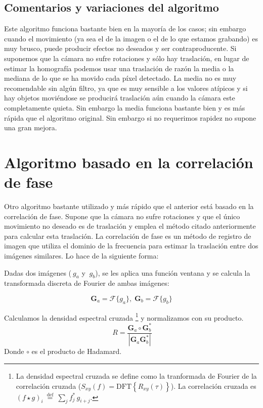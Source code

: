 \documentclass[a4paper,openright, 12pt]{book}
\begin{document}
\subsection{Comentarios y variaciones del algoritmo}
Este algoritmo funciona bastante bien en la mayoría de los casos; sin embargo cuando el movimiento (ya sea el de la imagen o el de lo que estamos grabando) es muy brusco, puede producir efectos no deseados y ser contraproducente. Si suponemos que la cámara no sufre rotaciones y sólo hay traslación, en lugar de estimar la homografía podemos usar una traslación de razón la media o la mediana de lo que se ha movido cada píxel detectado. La media no es muy recomendable sin algún filtro, ya que es muy sensible a los valores atípicos y si hay objetos moviéndose se producirá traslación aún cuando la cámara este completamente quieta. Sin embargo la media funciona bastante bien y es más rápida que el algoritmo original. Sin embargo si no requerimos rapidez no supone una gran mejora.
\newpage
\section{Algoritmo basado en la correlación de fase}
Otro algoritmo bastante utilizado y más rápido que el anterior está basado en la correlación de fase. Supone que la cámara no sufre rotaciones y que el único movimiento no deseado es de traslación y emplea el método citado anteriormente para calcular esta traslación.
\newline
La correlación de fase es un método de registro de imagen que utiliza el dominio de la frecuencia para estimar la traslación entre dos imágenes similares. Lo hace de la siguiente forma:


Dadas dos imágenes ($\ g_a$ y $\ g_b$), se les aplica una función ventana y se calcula la transformada discreta de Fourier de ambas imágenes:
  
\begin{equation*} 
    \mathbf{G}_a = \mathcal{F}\{g_a\}, \; \mathbf{G}_b = \mathcal{F}\{g_b\}
\end{equation*}

Calculamos la densidad espectral cruzada \footnote{La densidad espectral cruzada se define como la tranformada de Fourier de la correlación cruzada ($ 
    S_{xy}(f)=\mbox{DFT}\left\{R_{xy}(\tau)\right\} $).
La correlación cruzada es 
    $(f\star g)_i \ \stackrel{\mathrm{def}}{=}\ \sum_j f^*_j\,g_{i+j}$.    
     } y normalizamos con su producto.
\begin{equation*}
   \ R = \frac{ \mathbf{G}_a \circ \mathbf{G}_b^*}{|\mathbf{G}_a \mathbf{G}_b^*|}
\end{equation*}
Donde $\circ$ es el producto de Hadamard.
\end{document}
